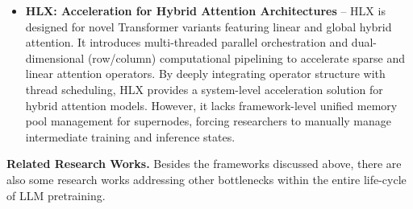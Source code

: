 \documentclass[11pt]{article}
\begin{document}
\begin{itemize}
    \item \textbf{HLX: Acceleration for Hybrid Attention Architectures} -- HLX is designed for novel Transformer variants featuring linear and global hybrid attention. It introduces multi-threaded parallel orchestration and dual-dimensional (row/column) computational pipelining to accelerate sparse and linear attention operators. By deeply integrating operator structure with thread scheduling, HLX provides a system-level acceleration solution for hybrid attention models. However, it lacks framework-level unified memory pool management for supernodes, forcing researchers to manually manage intermediate training and inference states.
\end{itemize}

\noindent \textbf{Related Research Works.} Besides the frameworks discussed above, there are also some research works addressing other bottlenecks within the entire life-cycle of LLM pretraining.
\end{document}
